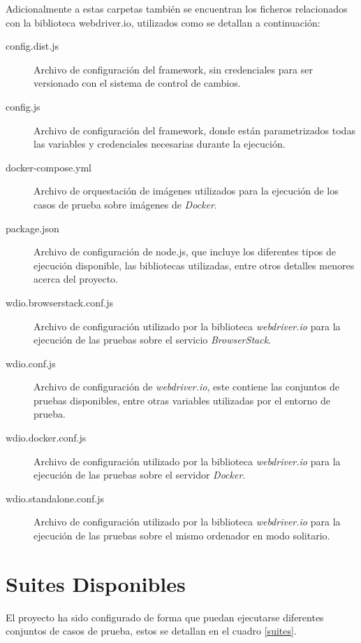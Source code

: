 Adicionalmente a estas carpetas también se encuentran los ficheros relacionados
con la biblioteca webdriver.io, utilizados como se detallan a continuación:

\begin{description}
\item [config.dist.js] Archivo de configuración del framework, sin
    credenciales para ser versionado con el sistema de control de cambios.
\item [config.js] Archivo de configuración del framework, donde están
    parametrizados todas las variables y credenciales necesarias durante la
    ejecución.
\item [docker-compose.yml] Archivo de orquestación de imágenes utilizados para
    la ejecución de los casos de prueba sobre imágenes de \emph{Docker}.
\item [package.json] Archivo de configuración de node.js, que incluye los
    diferentes tipos de ejecución disponible, las bibliotecas utilizadas, entre
    otros detalles menores acerca del proyecto.
\item [wdio.browserstack.conf.js] Archivo de configuración utilizado por la
    biblioteca \emph{webdriver.io} para la ejecución de las pruebas sobre el
    servicio \emph{BrowserStack}.
\item [wdio.conf.js] Archivo de configuración de \emph{webdriver.io}, este
    contiene las conjuntos de pruebas disponibles, entre otras variables
    utilizadas por el entorno de prueba.
\item [wdio.docker.conf.js] Archivo de configuración utilizado por la
    biblioteca \emph{webdriver.io} para la ejecución de las pruebas sobre el
    servidor \emph{Docker}.
\item [wdio.standalone.conf.js] Archivo de configuración utilizado por la
    biblioteca \emph{webdriver.io} para la ejecución de las pruebas sobre el
    mismo ordenador en modo solitario.
\end{description}

\section{Suites Disponibles}
El proyecto ha sido configurado de forma que puedan ejecutarse diferentes
conjuntos de casos de prueba, estos se detallan en el cuadro \ref{suites}.

